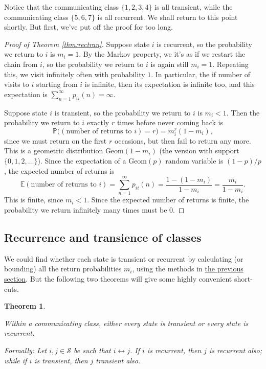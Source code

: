 \documentclass[
  a4paper,
]{article}
\newtheorem{theorem}{Theorem}[section]
\theoremstyle{definition}
\theoremstyle{definition}
\theoremstyle{definition}
\theoremstyle{remark}
\begin{document}
Notice that the communicating class \(\{1,2,3,4\}\) is all transient, while the communicating class \(\{5,6,7\}\) is all recurrent. We shall return to this point shortly. But first, we've put off the proof for too long.

\begin{proof}[Proof of Theorem \ref{thm:rectran}]

Suppose state \(i\) is recurrent, so the probability we return to \(i\) is \(m_i = 1\). By the Markov property, we it's as if we restart the chain from \(i\), so the probability we return to \(i\) is again still \(m_i = 1\). Repeating this, we visit infinitely often with probability \(1\). In particular, the if number of visits to \(i\) starting from \(i\) is infinite, then its expectation is infinite too, and this expectation is \(\sum_{n=1}^\infty p_{ii}(n) = \infty\).

Suppose state \(i\) is transient, so the probability we return to \(i\) is \(m_i < 1\). Then the probability we return to \(i\) exactly \(r\) times before never coming back is
\[  \mathbb P \big((\text{number of returns to $i$}) = r\big) = m_i^r(1-m_i) , \]
since we must return on the first \(r\) occasions, but then fail to return any more. This is a geometric distribution \(\text{Geom}(1-m_i)\) (the version with support \(\{0,1,2,\dots\}\)). Since the expectation of a \(\text{Geom}(p)\) random variable is \((1 - p)/p\), the expected number of returns is
\[ \mathbb E(\text{number of returns to $i$}) = \sum_{n=1}^\infty p_{ii}(n)  = \frac{1 - (1 - m_i)}{1 - m_i} = \frac{m_i}{1 - m_i} . \]
This is finite, since \(m_i <1\). Since the expected number of returns is finite, the probability we return infinitely many times must be \(0\).

\end{proof}

\hypertarget{rec-tran-classes}{%
\subsection{Recurrence and transience of classes}\label{rec-tran-classes}}

We could find whether each state is transient or recurrent by calculating (or bounding) all the return probabilities \(m_i\), using the methods in \protect\hyperlink{S08-hitting-times}{the previous section}. But the following two theorems will give some highly convenient short-cuts.

\begin{theorem}
\protect\hypertarget{thm:unlabeled-div-5}{}\label{thm:unlabeled-div-5}

Within a communicating class, either every state is transient or every state is recurrent.

Formally: Let \(i, j \in \mathcal S\) be such that \(i \leftrightarrow j\). If \(i\) is recurrent, then \(j\) is recurrent also; while if \(i\) is transient, then \(j\) transient also.

\end{theorem}
\end{document}

